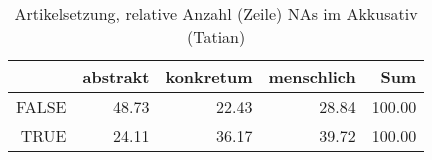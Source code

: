 \begin{table}[ht]
\centering
\begin{tabular}{rrrrr}
  \hline
 & abstrakt & konkretum & menschlich & Sum \\ 
  \hline
FALSE & 48.73 & 22.43 & 28.84 & 100.00 \\ 
  TRUE & 24.11 & 36.17 & 39.72 & 100.00 \\ 
   \hline
\end{tabular}
\caption{Artikelsetzung, relative Anzahl (Zeile) NAs im Akkusativ (Tatian)} 
\end{table}
